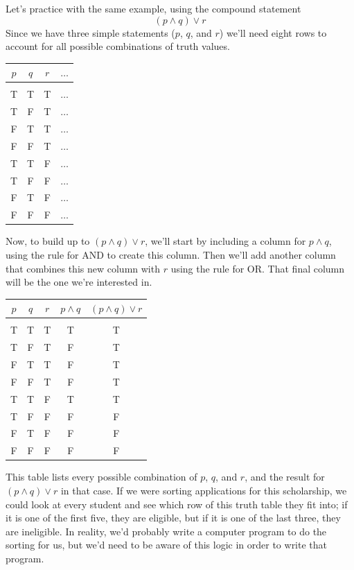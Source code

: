 Let's practice with the same example, using the compound statement
\[(p \wedge q) \vee r\]
Since we have three simple statements ($p$, $q$, and $r$) we'll need eight rows to account for all possible combinations of truth values.
\begin{center}
\begin{tabular}{|c c c c|}
\hline
$p$ & $q$ & $r$ & $\ldots$\\
\hline
& & &\\
T & T & T & $\ldots$\\
T & F & T & $\ldots$\\
F & T & T & $\ldots$\\
F & F & T & $\ldots$\\
T & T & F & $\ldots$\\
T & F & F & $\ldots$\\
F & T & F & $\ldots$\\
F & F & F & $\ldots$\\
\hline
\end{tabular}
\end{center}

Now, to build up to $(p \wedge q) \vee r$, we'll start by including a column for $p \wedge q$, using the rule for AND to create this column.  Then we'll add another column that combines this new column with $r$ using the rule for OR.  That final column will be the one we're interested in.
\begin{center}
\begin{tabular}{|c c c c c|}
\hline
$p$ & $q$ & $r$ & $p \wedge q$ & $(p \wedge q) \vee r$\\
\hline
& & & &\\
T & T & T & T & T\\
T & F & T & F & T\\
F & T & T & F & T\\
F & F & T & F & T\\
T & T & F & T & T\\
T & F & F & F & F\\
F & T & F & F & F\\
F & F & F & F & F\\
\hline
\end{tabular}
\end{center}
This table lists every possible combination of $p$, $q$, and $r$, and the result for $(p \wedge q) \vee r$ in that case.  If we were sorting applications for this scholarship, we could look at every student and see which row of this truth table they fit into; if it is one of the first five, they are eligible, but if it is one of the last three, they are ineligible.  In reality, we'd probably write a computer program to do the sorting for us, but we'd need to be aware of this logic in order to write that program.

